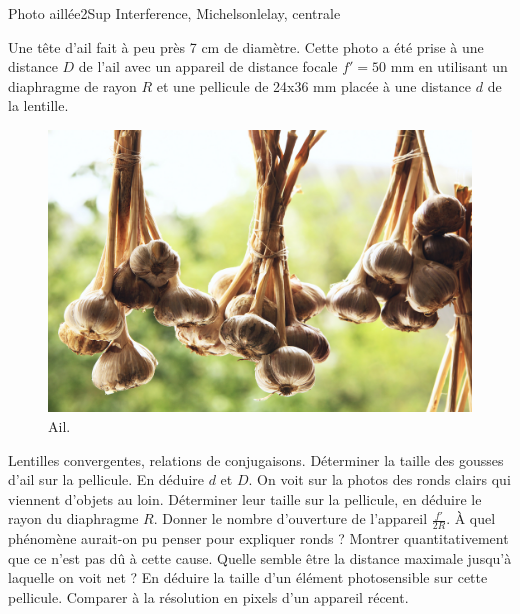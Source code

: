 \begin{exercise}{Photo aillée}{2}{Sup}
{Interference, Michelson}{lelay, centrale}

Une tête d'ail fait à peu près 7 cm de diamètre. Cette photo a été prise à une distance $D$ de l'ail avec un appareil de distance focale $f' = 50$ mm en utilisant un diaphragme de rayon $R$ et une pellicule de 24x36 mm placée à une distance $d$ de la lentille.

\begin{figure}[H]
    \centering
    \includegraphics[width=.8\linewidth]{optique/optiquegeometrique/ail.jpg}
    \caption{Ail.}
\end{figure}

\begin{questions}
    \questioncours Lentilles convergentes, relations de conjugaisons.
    \question Déterminer la taille des gousses d’ail sur la pellicule. En déduire $d$ et $D$.
    \question On voit sur la photos des ronds clairs qui viennent d’objets au loin. Déterminer leur taille sur la pellicule, en déduire le rayon
du diaphragme $R$. Donner le nombre d'ouverture de l'appareil $\frac{f'}{2R}$.
    \question À quel phénomène aurait-on pu penser pour expliquer ronds ? Montrer quantitativement que ce n’est pas dû à cette cause.
    \question Quelle semble être la distance maximale jusqu’à laquelle on voit net ? En déduire la taille d’un élément photosensible sur cette
pellicule. Comparer à la résolution en pixels d’un appareil récent.
\end{questions}

\end{exercise}

